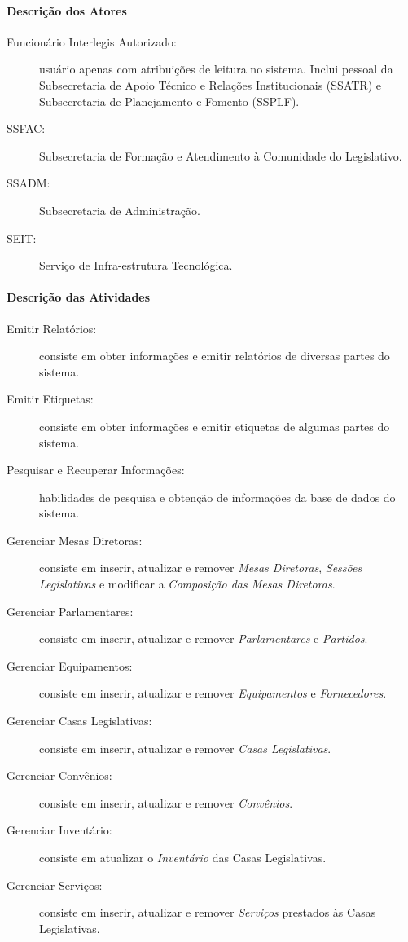 \paragraph{Descrição dos Atores}
\begin{description}
\item[Funcionário Interlegis Autorizado:] usuário apenas com
  atribuições de leitura no sistema. Inclui pessoal da Subsecretaria
  de Apoio Técnico e Relações Institucionais (SSATR) e Subsecretaria
  de Planejamento e Fomento (SSPLF).
\item[SSFAC:] Subsecretaria de Formação e Atendimento à Comunidade do
  Legislativo.
\item[SSADM:] Subsecretaria de Administração.
\item[SEIT:] Serviço de Infra-estrutura Tecnológica.
\end{description}

\paragraph{Descrição das Atividades}
\begin{description}
\item[Emitir Relatórios:] consiste em obter informações e emitir
  relatórios de diversas partes do sistema.
\item[Emitir Etiquetas:] consiste em obter informações e emitir
  etiquetas de algumas partes do sistema.
\item[Pesquisar e Recuperar Informações:] habilidades de pesquisa e
  obtenção de informações da base de dados do sistema.
\item[Gerenciar Mesas Diretoras:] consiste em inserir, atualizar e
  remover \emph{Mesas Diretoras}, \emph{Sessões Legislativas} e
  modificar a \emph{Composição das Mesas Diretoras}.
\item[Gerenciar Parlamentares:] consiste em inserir, atualizar e
  remover \emph{Parlamentares} e \emph{Partidos}.
\item[Gerenciar Equipamentos:] consiste em inserir, atualizar e
  remover \emph{Equipamentos} e \emph{Fornecedores}.
\item[Gerenciar Casas Legislativas:] consiste em inserir, atualizar e
  remover \emph{Casas Legislativas}.
\item[Gerenciar Convênios:] consiste em inserir, atualizar e remover
  \emph{Convênios}.
\item[Gerenciar Inventário:] consiste em atualizar o \emph{Inventário}
  das Casas Legislativas.
\item[Gerenciar Serviços:] consiste em inserir, atualizar e remover
  \emph{Serviços} prestados às Casas Legislativas.
\end{description}

